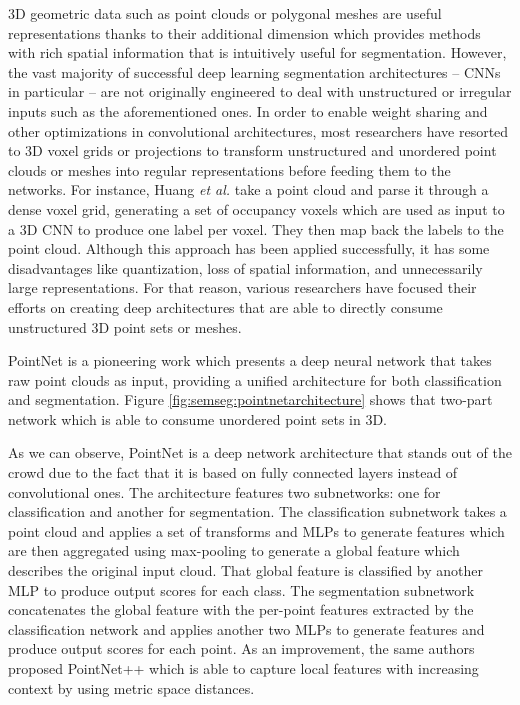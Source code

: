 \acs{3D} geometric data such as point clouds or polygonal meshes are useful representations thanks to their additional dimension which provides methods with rich spatial information that is intuitively useful for segmentation. However, the vast majority of successful deep learning segmentation architectures -- \acp{CNN} in particular -- are not originally engineered to deal with unstructured or irregular inputs such as the aforementioned ones. In order to enable weight sharing and other optimizations in convolutional architectures, most researchers have resorted to 3D voxel grids or projections to transform unstructured and unordered point clouds or meshes into regular representations before feeding them to the networks. For instance, Huang \emph{et al.}\cite{Huang2016} take a point cloud and parse it through a dense voxel grid, generating a set of occupancy voxels which are used as input to a 3D \acs{CNN} to produce one label per voxel. They then map back the labels to the point cloud. Although this approach has been applied successfully, it has some disadvantages like quantization, loss of spatial information, and unnecessarily large representations. For that reason, various researchers have focused their efforts on creating deep architectures that are able to directly consume unstructured \acs{3D} point sets or meshes.

PointNet\cite{Qi2016} is a pioneering work which presents a deep neural network that takes raw point clouds as input, providing a unified architecture for both classification and segmentation. Figure \ref{fig:semseg:pointnetarchitecture} shows that two-part network which is able to consume unordered point sets in 3D.

As we can observe, PointNet is a deep network architecture that stands out of the crowd due to the fact that it is based on fully connected layers instead of convolutional ones. The architecture features two subnetworks: one for classification and another for segmentation. The classification subnetwork takes a point cloud and applies a set of transforms and \acp{MLP} to generate features which are then aggregated using max-pooling to generate a global feature which describes the original input cloud. That global feature is classified by another \ac{MLP} to produce output scores for each class. The segmentation subnetwork concatenates the global feature with the per-point features extracted by the classification network and applies another two \acp{MLP} to generate features and produce output scores for each point. As an improvement, the same authors proposed PointNet++ \cite{Qi2017} which is able to capture local features with increasing context by using metric space distances.

